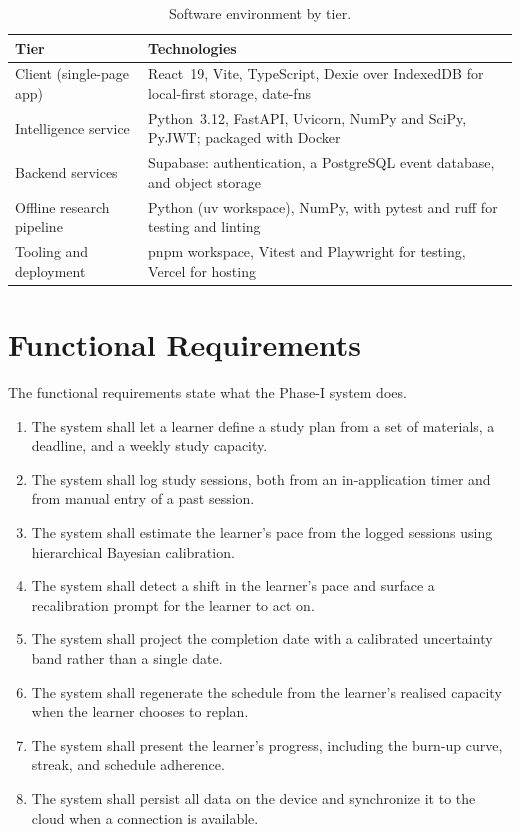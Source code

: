 \begin{table}[htbp]
\centering
\caption{Software environment by tier.}
\label{tab:software}
\begin{tabular}{p{3.6cm} p{8.6cm}}
\toprule
\textbf{Tier} & \textbf{Technologies} \\
\midrule
Client (single-page app) & React~19, Vite, TypeScript, Dexie over IndexedDB for local-first storage, date-fns \\
Intelligence service & Python~3.12, FastAPI, Uvicorn, NumPy and SciPy, PyJWT; packaged with Docker \\
Backend services & Supabase: authentication, a PostgreSQL event database, and object storage \\
Offline research pipeline & Python (uv workspace), NumPy, with pytest and ruff for testing and linting \\
Tooling and deployment & pnpm workspace, Vitest and Playwright for testing, Vercel for hosting \\
\bottomrule
\end{tabular}
\end{table}

\section{Functional Requirements}
The functional requirements state what the Phase-I system does.
\begin{enumerate}[label=\textbf{FR-\arabic*},noitemsep,leftmargin=*]
    \item The system shall let a learner define a study plan from a set of materials, a deadline, and a weekly study capacity.
    \item The system shall log study sessions, both from an in-application timer and from manual entry of a past session.
    \item The system shall estimate the learner's pace from the logged sessions using hierarchical Bayesian calibration.
    \item The system shall detect a shift in the learner's pace and surface a recalibration prompt for the learner to act on.
    \item The system shall project the completion date with a calibrated uncertainty band rather than a single date.
    \item The system shall regenerate the schedule from the learner's realised capacity when the learner chooses to replan.
    \item The system shall present the learner's progress, including the burn-up curve, streak, and schedule adherence.
    \item The system shall persist all data on the device and synchronize it to the cloud when a connection is available.
\end{enumerate}

